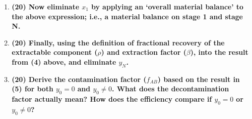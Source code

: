 \documentclass[11pt,a4paper]{article}
\begin{document}
\begin{enumerate}[leftmargin=*,topsep=0pt,font=\bfseries]
        
        
        
        
        
        
        
        
        
        
        
        
        
        
        
        \newpage 
    \item\textbf{(20) Now eliminate $x_1$ by applying an ‘overall material balance’ to the above expression; i.e., a material balance on stage 1 and stage N.}
        \vspace{0.25in}\\

        
        
        
        
        
        
        
        
        
        
        
        
        
        
        \newpage 
    \item\textbf{(20) Finally, using the definition of fractional recovery of the extractable component ($\rho$) and extraction factor ($\beta$), into the result from (4) above, and eliminate $y_N$.}
        \vspace{0.25in}\\















        \newpage 
    \item\textbf{(20) Derive the contamination factor ($f_{AB}$) based on the result in (5) for both $y_0 = 0$ and $y_0 \neq 0$. What does the decontamination factor actually mean? How does the efficiency compare if $y_0 = 0$ or $y_0 \neq 0$?}
        \vspace{0.25in}\\
















\end{enumerate}
\end{document}
